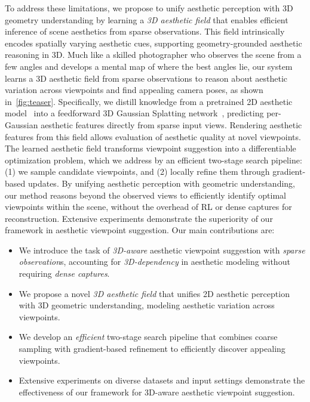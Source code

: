To address these limitations, we propose to unify aesthetic perception with 3D geometry understanding by learning a \textit{3D aesthetic field} that enables efficient inference of scene aesthetics from sparse observations.
This field intrinsically encodes spatially varying aesthetic cues, supporting geometry-grounded aesthetic reasoning in 3D.
Much like a skilled photographer who observes the scene from a few angles and develops a mental map of where the best angles lie, our system learns a 3D aesthetic field from sparse observations to reason about aesthetic variation across viewpoints and find appealing camera poses, as shown in~\cref{fig:teaser}.
Specifically, we distill knowledge from a pretrained 2D aesthetic model~\cite{wei2018good} into a feedforward 3D Gaussian Splatting network~\cite{depthsplat}, predicting per-Gaussian aesthetic features directly from sparse input views. Rendering aesthetic features from this field allows evaluation of aesthetic quality at novel viewpoints. The learned aesthetic field transforms viewpoint suggestion into a differentiable optimization problem, which we address by an efficient two-stage search pipeline: (1) we sample candidate viewpoints, and (2) locally refine them through gradient-based updates. By unifying aesthetic perception with geometric understanding, our method reasons beyond the observed views to efficiently identify optimal viewpoints within the scene, without the overhead of RL or dense captures for reconstruction. %
Extensive experiments demonstrate the superiority of our framework in aesthetic viewpoint suggestion.
Our main contributions are:
\begin{itemize}
    \item We introduce the task of \textit{3D-aware} aesthetic viewpoint suggestion with \textit{sparse observation}s, accounting for \textit{3D-dependency} in aesthetic modeling without requiring \textit{dense captures}.

    \item We propose a novel \textit{3D aesthetic field} that unifies 2D aesthetic perception with 3D geometric understanding, modeling aesthetic variation across viewpoints.

    \item We develop an \textit{efficient} two-stage search pipeline that combines coarse sampling with gradient-based refinement to efficiently discover appealing viewpoints.

    \item Extensive experiments on diverse datasets and input settings demonstrate the effectiveness of our framework for 3D-aware aesthetic viewpoint suggestion.
\end{itemize}

